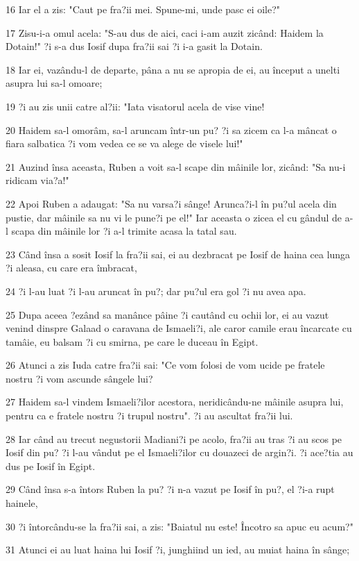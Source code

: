\par 16 Iar el a zis: "Caut pe fra?ii mei. Spune-mi, unde pasc ei oile?"
\par 17 Zisu-i-a omul acela: "S-au dus de aici, caci i-am auzit zicând: Haidem la Dotain!" ?i s-a dus Iosif dupa fra?ii sai ?i i-a gasit la Dotain.
\par 18 Iar ei, vazându-l de departe, pâna a nu se apropia de ei, au început a unelti asupra lui sa-l omoare;
\par 19 ?i au zis unii catre al?ii: "Iata visatorul acela de vise vine!
\par 20 Haidem sa-l omorâm, sa-l aruncam într-un pu? ?i sa zicem ca l-a mâncat o fiara salbatica ?i vom vedea ce se va alege de visele lui!"
\par 21 Auzind însa aceasta, Ruben a voit sa-l scape din mâinile lor, zicând: "Sa nu-i ridicam via?a!"
\par 22 Apoi Ruben a adaugat: "Sa nu varsa?i sânge! Arunca?i-l în pu?ul acela din pustie, dar mâinile sa nu vi le pune?i pe el!" Iar aceasta o zicea el cu gândul de a-l scapa din mâinile lor ?i a-l trimite acasa la tatal sau.
\par 23 Când însa a sosit Iosif la fra?ii sai, ei au dezbracat pe Iosif de haina cea lunga ?i aleasa, cu care era îmbracat,
\par 24 ?i l-au luat ?i l-au aruncat în pu?; dar pu?ul era gol ?i nu avea apa.
\par 25 Dupa aceea ?ezând sa manânce pâine ?i cautând cu ochii lor, ei au vazut venind dinspre Galaad o caravana de Ismaeli?i, ale caror camile erau încarcate cu tamâie, eu balsam ?i cu smirna, pe care le duceau în Egipt.
\par 26 Atunci a zis Iuda catre fra?ii sai: "Ce vom folosi de vom ucide pe fratele nostru ?i vom ascunde sângele lui?
\par 27 Haidem sa-l vindem Ismaeli?ilor acestora, neridicându-ne mâinile asupra lui, pentru ca e fratele nostru ?i trupul nostru". ?i au ascultat fra?ii lui.
\par 28 Iar când au trecut negustorii Madiani?i pe acolo, fra?ii au tras ?i au scos pe Iosif din pu? ?i l-au vândut pe el Ismaeli?ilor cu douazeci de argin?i. ?i ace?tia au dus pe Iosif în Egipt.
\par 29 Când însa s-a întors Ruben la pu? ?i n-a vazut pe Iosif în pu?, el ?i-a rupt hainele,
\par 30 ?i întorcându-se la fra?ii sai, a zis: "Baiatul nu este! Încotro sa apuc eu acum?"
\par 31 Atunci ei au luat haina lui Iosif ?i, junghiind un ied, au muiat haina în sânge;
